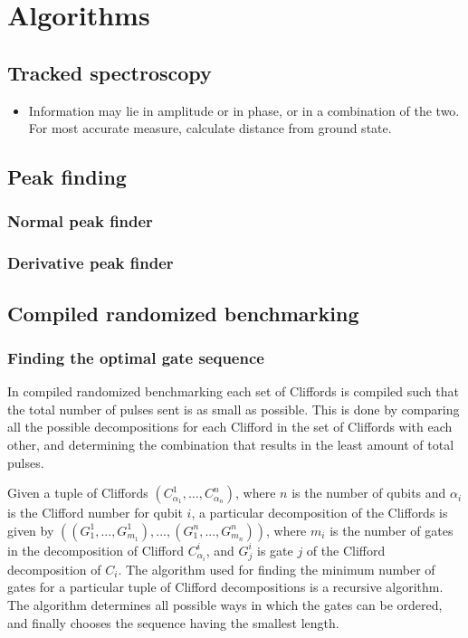 \chapter{Algorithms}
  \section{Tracked spectroscopy}
  \label{sec:Tracked spectroscopy}
    \begin{itemize}
      \item Information may lie in amplitude or in phase, or in a combination of the two. For most accurate measure, calculate distance from ground state.
    \end{itemize}
  \section{Peak finding}
    \subsection{Normal peak finder}
    \subsection{Derivative peak finder}
  \section{Compiled randomized benchmarking}
    \label{sec:compiled randomized benchmarking algorithm}
    \subsection{Finding the optimal gate sequence}
      In compiled randomized benchmarking each set of Cliffords is compiled such that the total number of pulses sent is as small as possible. This is done by comparing all the possible decompositions for each Clifford in the set of Cliffords with each other, and determining the combination that results in the least amount of total pulses.

      Given a tuple of Cliffords $\left(C_{\alpha_1}^1, \dots, C_{\alpha_n}^n\right)$, where $n$ is the number of qubits and $\alpha_i$ is the Clifford number for qubit $i$, a particular decomposition of the Cliffords is given by $\left(\left( G_1^1, ..., G_{m_1}^1 \right) , ..., \left(G_1^n, ..., G_{m_n}^n\right)\right)$, where $m_i$ is the number of gates in the decomposition of Clifford $C_{\alpha_i}^i$, and $G_j^i$ is gate $j$ of the Clifford decomposition of $C_i$. The algorithm used for finding the minimum number of gates for a particular tuple of Clifford decompositions is a recursive algorithm. The algorithm determines all possible ways in which the gates can be ordered, and finally chooses the sequence having the smallest length.

